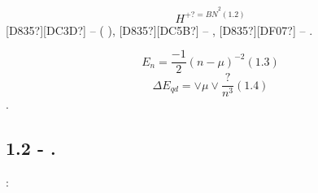 \documentclass[a4paper]{article}
\begin{document}
\begin{equation*}
H^{+?=B\widehat  N^2(1.2)}
\end{equation*}
\textlatin{[D835?]}\textlatin{[DC3D?]} -- {\cyrp}{\cyro}{\cyrl}{\cyrn}{\cyrery}{\cyrishrt}
{\cyrm}{\cyro}{\cyrm}{\cyre}{\cyrn}{\cyrt} {\cyrm}{\cyro}{\cyrl}{\cyre}{\cyrk}{\cyru}{\cyrl}{\cyrery}
({\cyri}{\cyrs}{\cyrk}{\cyrl}{\cyryu}{\cyrch}{\cyra}{\cyrya} {\cyrs}{\cyrp}{\cyri}{\cyrn}
{\cyrr}{\cyri}{\cyrd}{\cyrb}{\cyre}{\cyrr}{\cyrg}{\cyro}{\cyrv}{\cyrs}{\cyrk}{\cyro}{\cyrg}{\cyro}
{\cyrerev}{\cyrl}{\cyre}{\cyrk}{\cyrt}{\cyrr}{\cyro}{\cyrn}{\cyra}), \textlatin{[D835?]}\textlatin{[DC5B?]} --
{\cyrg}{\cyrl}{\cyra}{\cyrv}{\cyrn}{\cyro}{\cyre} {\cyrk}{\cyrv}{\cyra}{\cyrn}{\cyrt}{\cyro}{\cyrv}{\cyro}{\cyre}
{\cyrch}{\cyri}{\cyrs}{\cyrl}{\cyro}, \textlatin{[D835?]}\textlatin{[DF07?]} --
{\cyrk}{\cyrv}{\cyra}{\cyrn}{\cyrt}{\cyro}{\cyrv}{\cyrery}{\cyrishrt} {\cyrd}{\cyre}{\cyrf}{\cyre}{\cyrk}{\cyrt}.

\begin{equation*}
E_n=\frac{-1} 2\left(n-\mu \right)^{-2}(1.3)
\end{equation*}
\begin{equation*}
{\Delta}E_{\mathit{qd}}=\vee \mu \vee \frac ?{n^3}(1.4)
\end{equation*}
{\cyrs}{\cyrd}{\cyrv}{\cyri}{\cyrg} {\cyrerev}{\cyrn}{\cyre}{\cyrr}{\cyrg}{\cyri}{\cyri}
{\cyru}{\cyrr}{\cyro}{\cyrv}{\cyrn}{\cyrya}.

\subsection{1.2 {\CYRZ}{\cyra}{\cyrd}{\cyra}{\cyrch}{\cyra} {\cyro}
{\cyrr}{\cyri}{\cyrd}{\cyrb}{\cyre}{\cyrr}{\cyrg}{\cyro}{\cyrv}{\cyrs}{\cyrk}{\cyro}{\cyrm}
{\cyrerev}{\cyrl}{\cyre}{\cyrk}{\cyrt}{\cyrr}{\cyro}{\cyrn}{\cyre} {\cyrv}
{\cyrk}{\cyru}{\cyrl}{\cyro}{\cyrn}-{\cyrd}{\cyri}{\cyrp}{\cyro}{\cyrl}{\cyrsftsn}{\cyrn}{\cyro}{\cyrm}
{\cyrp}{\cyro}{\cyrt}{\cyre}{\cyrn}{\cyrc}{\cyri}{\cyra}{\cyrl}{\cyre}.}
\hypertarget{RefHeading4673463868395}{}{\CYRS} {\cyru}{\cyrch}{\cyre}{\cyrt}{\cyro}{\cyrm}
{\cyrd}{\cyri}{\cyrp}{\cyro}{\cyrl}{\cyrsftsn}{\cyrn}{\cyro}{\cyrg}{\cyro}
{\cyrv}{\cyrz}{\cyra}{\cyri}{\cyrm}{\cyro}{\cyrd}{\cyre}{\cyrishrt}{\cyrs}{\cyrt}{\cyrv}{\cyri}{\cyrya}
{\cyrm}{\cyrery} {\cyrm}{\cyro}{\cyrzh}{\cyre}{\cyrm} {\cyrz}{\cyra}{\cyrp}{\cyri}{\cyrs}{\cyra}{\cyrt}{\cyrsftsn}
{\cyrg}{\cyra}{\cyrm}{\cyri}{\cyrl}{\cyrsftsn}{\cyrt}{\cyro}{\cyrn}{\cyri}{\cyra}{\cyrn}
{\cyrr}{\cyri}{\cyrd}{\cyrb}{\cyre}{\cyrr}{\cyrg}{\cyro}{\cyrv}{\cyrs}{\cyrk}{\cyro}{\cyrishrt}
{\cyrs}{\cyri}{\cyrs}{\cyrt}{\cyre}{\cyrm}{\cyrery} {\cyrt}{\cyra}{\cyrk}{\cyri}{\cyrm}
{\cyro}{\cyrb}{\cyrr}{\cyra}{\cyrz}{\cyro}{\cyrm}:
\end{document}
